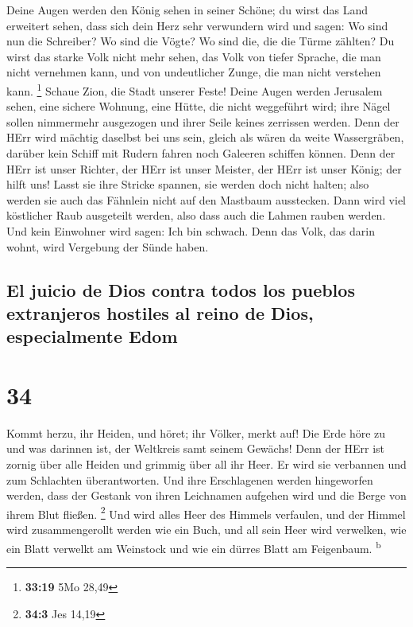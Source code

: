  Deine Augen werden den König sehen in seiner Schöne; du
wirst das Land erweitert sehen,  dass sich dein Herz sehr
verwundern wird und sagen: Wo sind nun die Schreiber? Wo sind die Vögte?
Wo sind die, die die Türme zählten?  Du wirst das starke
Volk nicht mehr sehen, das Volk von tiefer Sprache, die man nicht
vernehmen kann, und von undeutlicher Zunge, die man nicht verstehen
kann. \footnote{\textbf{33:19} 5Mo 28,49}  Schaue Zion,
die Stadt unserer Feste! Deine Augen werden Jerusalem sehen, eine
sichere Wohnung, eine Hütte, die nicht weggeführt wird; ihre Nägel
sollen nimmermehr ausgezogen und ihrer Seile keines zerrissen werden.
 Denn der HErr wird mächtig daselbst bei uns sein, gleich
als wären da weite Wassergräben, darüber kein Schiff mit Rudern fahren
noch Galeeren schiffen können.  Denn der HErr ist unser
Richter, der HErr ist unser Meister, der HErr ist unser König; der hilft
uns!  Lasst sie ihre Stricke spannen, sie werden doch
nicht halten; also werden sie auch das Fähnlein nicht auf den Mastbaum
ausstecken. Dann wird viel köstlicher Raub ausgeteilt werden, also dass
auch die Lahmen rauben werden.  Und kein Einwohner wird
sagen: Ich bin schwach. Denn das Volk, das darin wohnt, wird Vergebung
der Sünde haben.

\hypertarget{el-juicio-de-dios-contra-todos-los-pueblos-extranjeros-hostiles-al-reino-de-dios-especialmente-edom}{%
\subsection{El juicio de Dios contra todos los pueblos extranjeros
hostiles al reino de Dios, especialmente
Edom}\label{el-juicio-de-dios-contra-todos-los-pueblos-extranjeros-hostiles-al-reino-de-dios-especialmente-edom}}

\hypertarget{section-33}{%
\section{34}\label{section-33}}

 Kommt herzu, ihr Heiden, und höret; ihr Völker, merkt
auf! Die Erde höre zu und was darinnen ist, der Weltkreis samt seinem
Gewächs!  Denn der HErr ist zornig über alle Heiden und
grimmig über all ihr Heer. Er wird sie verbannen und zum Schlachten
überantworten.  Und ihre Erschlagenen werden hingeworfen
werden, dass der Gestank von ihren Leichnamen aufgehen wird und die
Berge von ihrem Blut fließen. \footnote{\textbf{34:3} Jes 14,19}
 Und wird alles Heer des Himmels verfaulen, und der Himmel
wird zusammengerollt werden wie ein Buch, und all sein Heer wird
verwelken, wie ein Blatt verwelkt am Weinstock und wie ein dürres Blatt
am Feigenbaum. \textsuperscript{b}

